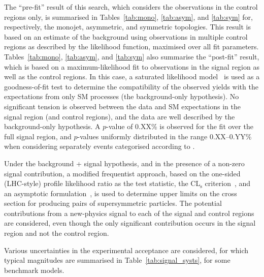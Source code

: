 The ``pre-fit'' result of this search, which considers the
observations in the control regions only, is summarised in
Tables~\ref{tab:mono}, \ref{tab:asym}, and \ref{tab:sym} for,
respectively, the monojet, asymmetric, and symmetric topologies. This
result is based on an estimate of the \znunuj background using
observations in multiple control regions as described by the
likelihood function, maximised over all fit
parameters. Tables~\ref{tab:mono}, \ref{tab:asym}, and \ref{tab:sym}
also summarise the ``post-fit'' result, which is based on a
maximum-likelihood fit to observations in the signal region as well as
the control regions.  In this case, a saturated likelihood
model~\cite{} is used as a goodness-of-fit test to determine the
compatibility of the observed yields with the expectations from only
SM processes (\ie the background-only hypothesis). No significant
tension is observed between the data and SM expectations in the signal
region (and control regions), and the data are well described by the
background-only hypothesis. A $p$-value of 0.XX\% is observed for the
fit over the full signal region, and $p$-values uniformly distributed
in the range 0.XX--0.YY\% when considering separately events
categorised according to \njet.

Under the background + signal hypothesis, and in the presence of a
non-zero signal contribution, a modified frequentist approach, based
on the one-sided (LHC-style) profile likelihood ratio as the test
statistic, the CL$_{\mathrm{s}}$ criterion~\cite{junk, read}, and an
asymptotic formulation~\cite{Cowan:2010js}, is used to determine upper
limits on the cross section for producing pairs of supersymmetric
particles. The potential contributions from a new-physics signal to
each of the signal and control regions are considered, even though the
only significant contribution occurs in the signal region and not the
control region.






Various uncertainties in the experimental acceptance are considered,
for which typical magnitudes are summarised in
Table~\ref{tab:signal_systs}, for some benchmark models.

